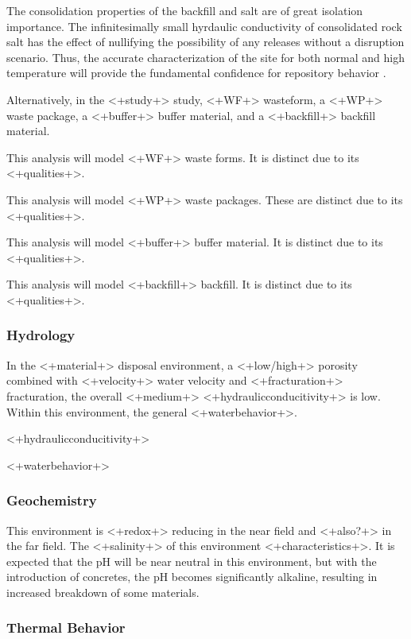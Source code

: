 {The consolidation properties of the backfill and salt are of great isolation 
importance. The infinitesimally small hyrdaulic conductivity of consolidated 
rock salt has the effect of nullifying the possibility of any releases without 
a disruption scenario. Thus, the accurate characterization of the site for both 
normal and high temperature will provide the fundamental confidence for 
repository behavior \cite{brewitz_long_2002}.

Alternatively, in the <+study+> study, <+WF+> wasteform, a <+WP+> waste package, a <+buffer+> 
buffer material, and a <+backfill+> backfill material.

This analysis will model <+WF+> waste forms. It is distinct due to its 
<+qualities+>.

This analysis will model <+WP+> waste packages. These are distinct due to its 
<+qualities+>.

This analysis will model <+buffer+> buffer material. It is distinct due to its 
<+qualities+>.

This analysis will model <+backfill+> backfill. It is distinct due to its 
<+qualities+>.

\subsubsection{Hydrology}

In the <+material+> disposal environment, a <+low/high+> porosity combined with 
<+velocity+> water velocity and <+fracturation+> fracturation, the overall 
<+medium+> <+hydraulicconducitivity+> is low. Within this environment, the  
general <+waterbehavior+>.

<+hydraulicconducitivity+>

<+waterbehavior+>

\subsubsection{Geochemistry}

This environment is <+redox+> reducing in the near field and <+also?+> in the 
far field. The <+salinity+> of this environment <+characteristics+>. It is 
expected that the pH will be near neutral in this environment, but with the 
introduction of concretes, the pH becomes significantly alkaline, resulting in 
increased breakdown of some materials. 

\subsubsection{Thermal Behavior}

}
